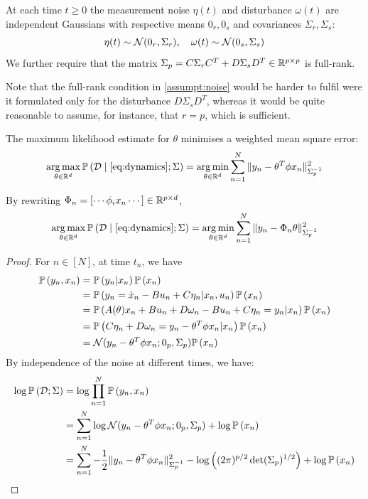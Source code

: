 \documentclass{article}
\begin{document}
\begin{assumption}
\label{assumpt:noise}
At each time $t\geq0$ the measurement noise $\eta(t)$ and disturbance $\omega(t)$  are independent Gaussians with respective means $0_r, 0_s$ and covariances $\Sigma_r, \Sigma_s$:
\begin{equation*}
    \eta(t)\sim \mathcal{N}(0_r,\Sigma_r),\quad\omega(t)\sim \mathcal{N}(0_s,\Sigma_s)
\end{equation*}
We further require that the matrix $\Sigma_p = C\Sigma_r C^T + D\Sigma_s D^T \in \mathbb{R}^{p\times p}$ is full-rank.
\end{assumption}

Note that the full-rank condition in \autoref{assumpt:noise} would be harder to fulfil were it formulated only for the disturbance $D\Sigma_s D^T$, whereas it would be quite reasonable to assume, for instance, that $r=p$, which is sufficient.

\begin{proposition}
\label{prop:mle}
The maximum likelihood estimate for $\theta$ minimises a weighted mean square error:
\begin{equation*}
    \operatorname*{arg\,max}_{\theta\in\mathbb{R}^d} \mathbb{P}\left(\mathcal{D}\;\middle|\;\eqref{eq:dynamics};\Sigma\right) = \operatorname*{arg\,min}_{\theta\in\mathbb{R}^d} \sum_{n=1}^N \|y_n -\theta^T\phi x_n\|_{\Sigma_p^{-1}}^2
\end{equation*}

By rewriting $\Phi_n = [\cdots \phi_i x_n \cdots]\in\mathbb{R}^{p\times d}$,
\begin{equation*}
    \operatorname*{arg\,max}_{\theta\in\mathbb{R}^d} \mathbb{P}\left(\mathcal{D}\;\middle|\;\eqref{eq:dynamics};\Sigma\right) = \operatorname*{arg\,min}_{\theta\in\mathbb{R}^d} \sum_{n=1}^N \|y_n -\Phi_n \theta\|_{\Sigma_p^{-1}}^2
\end{equation*}
\end{proposition}
\begin{proof}
For $n\in[N]$, at time $t_n$, we have
\begin{align*}
    \mathbb{P}\left(y_n, x_n\right) 
    &= \mathbb{P}\left(y_n|x_n\right)\mathbb{P}\left(x_n\right)\\
    &= \mathbb{P}\left(y_n = \dot{x}_n - Bu_n +C\eta_n|x_n,u_n\right)\mathbb{P}\left(x_n\right)\\
    &= \mathbb{P}\left(A(\theta)x_n + B u_n + D \omega_n - Bu_n +C\eta_n = y_n|x_n\right)\mathbb{P}\left(x_n\right)\\
    &= \mathbb{P}\left(C\eta_n + D \omega_n = y_n- \theta^T \phi x_n |x_n\right)\mathbb{P}\left(x_n\right)\\
    &= \mathcal{N}(y_n - \theta^T \phi x_n; 0_p,\Sigma_p)\mathbb{P}\left(x_n\right)
\end{align*}
By independence of the noise at different times, we have:
\begin{align*}
    \log\mathbb{P}\left(\mathcal{D};\Sigma\right) &= \log\prod_{n=1}^N\mathbb{P}\left(y_n, x_n\right)\\
    &= \sum_{n=1}^N\log \mathcal{N}(y_n- \theta^T \phi x_n;0_p,\Sigma_p) + \log\mathbb{P}\left(x_n\right)\\
    &= \sum_{n=1}^N -\frac{1}{2} \|y_n -\theta^T\phi x_n\|_{\Sigma_p^{-1}}^2 - \log\left((2\pi)^{p/2} \det(\Sigma_p)^{1/2}\right) + \log\mathbb{P}\left(x_n\right)
\end{align*}
\end{proof}
\end{document}
